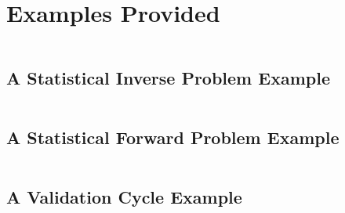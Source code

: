 \chapter{Examples Provided}\label{ch-fp}
\thispagestyle{headings}

$~$\\

\section{A Statistical Inverse Problem Example}\label{sc-examples-mac}

$~$\\

\section{A Statistical Forward Problem Example}\label{sc-examples-moc}

$~$\\

\section{A Validation Cycle Example}\label{sc-examples-val}
